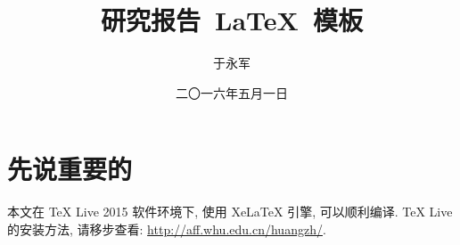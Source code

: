\documentclass{ice_report}  %
\begin{document}


\title{研究报告~\LaTeX~模板}
\author{于永军}
\date{二〇一六年五月一日}               %


\maketitle

\pagestyle{oldplain}
\tableofcontents
\pagestyle{oldplain}\cleardoublepage
\newpage  \pagestyle{fancy} \fancyfancy
\mainmatter %
\baselineskip=20pt  %

\chapter{先说重要的}

本文在 TeX Live 2015 软件环境下, 使用 XeLaTeX 引擎, 可以顺利编译.
TeX Live 的安装方法, 请移步查看: \url{http://aff.whu.edu.cn/huangzh/}.
\end{document}
